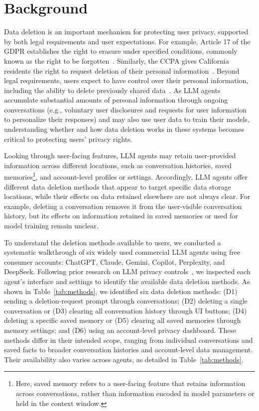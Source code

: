\section{Background}
\label{sec:background}

%
Data deletion is an important mechanism for protecting user privacy, supported by both legal requirements and user expectations. 
%
For example, Article 17 of the GDPR establishes the right to erasure under specified conditions, commonly known as the right to be forgotten~\cite{gdpr2016}. 
%
Similarly, the CCPA gives California residents the right to request deletion of their personal information~\cite{ccpa2018}. 
%
Beyond legal requirements, users expect to have control over their personal information, including the ability to delete previously shared data~\cite{murillo2018if}.
%
As LLM agents accumulate substantial amounts of personal information through ongoing conversations (e.g., voluntary user disclosures and requests for user information to personalize their responses) and may also use user data to train their models, understanding whether and how data deletion works in these systems becomes critical to protecting users' privacy rights.

%
Looking through user-facing features, LLM agents may retain user-provided information across different locations, such as conversation histories, saved memories\footnote{Here, saved memory refers to a user-facing feature that retains information across conversations, rather than information encoded in model parameters or held in the context window.}, and account-level profiles or settings.
%
Accordingly, LLM agents offer different data deletion methods that appear to target specific data storage locations, while their effects on data retained elsewhere are not always clear.
%
For example, deleting a conversation removes it from the user-visible conversation history, but its effects on information retained in saved memories or used for model training remain unclear.


To understand the deletion methods available to users, we conducted a systematic walkthrough of six widely used commercial LLM agents using free consumer accounts:  ChatGPT, Claude, Gemini, Copilot, Perplexity, and DeepSeek.
%
Following prior research on LLM privacy controls~\cite{li2026privacy}, we inspected each agent's interface and settings to identify the available data deletion methods.
%
As shown in Table~\ref{tab:methods}, we identified six data deletion methods: (D1) sending a deletion-request prompt through conversations; (D2) deleting a single conversation or (D3) clearing all conversation history through UI buttons; (D4) deleting a specific saved memory or (D5) clearing all saved memories through memory settings; and (D6) using an account-level privacy dashboard.
%
These methods differ in their intended scope, ranging from individual conversations and saved facts to broader conversation histories and account-level data management.
%
Their availability also varies across agents, as detailed in Table~\ref{tab:methods}.



